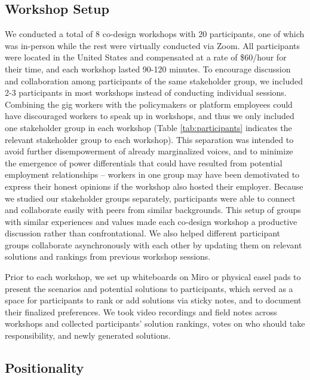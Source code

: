 \subsection{Workshop Setup}
We conducted a total of 8 co-design workshops with 20 participants, one of which was in-person while the rest were virtually conducted via Zoom. All participants were located in the United States and compensated at a rate of \$60/hour for their time, and each workshop lasted 90-120 minutes. To encourage discussion and collaboration among participants of the same stakeholder group, we included 2-3 participants in most workshops instead of conducting individual sessions. 
Combining the gig workers with the policymakers or platform employees could have discouraged workers to speak up in workshops, and thus we only included one stakeholder group in each workshop (Table \ref{tab:participants} indicates the relevant stakeholder group to each workshop). This separation was intended to avoid further disempowerment of already marginalized voices, and to minimize the emergence of power differentials that could have resulted from potential employment relationships  -- workers in one group may have been demotivated to express their honest opinions if the workshop also hosted their employer.
Because we studied our stakeholder groups separately, participants were able to connect and collaborate easily with peers from similar backgrounds. This setup of groups with similar experiences and values made each co-design workshop a productive discussion rather than confrontational. We also helped different participant groups collaborate asynchronously with each other by updating them on relevant solutions and rankings from previous workshop sessions.

Prior to each workshop, we set up whiteboards on Miro or physical easel pads to present the scenarios and potential solutions to participants, which served as a space for participants to rank or add solutions via sticky notes, and to document their finalized preferences. We took video recordings and field notes across workshops and collected participants' solution rankings, votes on who should take responsibility, and newly generated solutions.


\subsection{Positionality}


